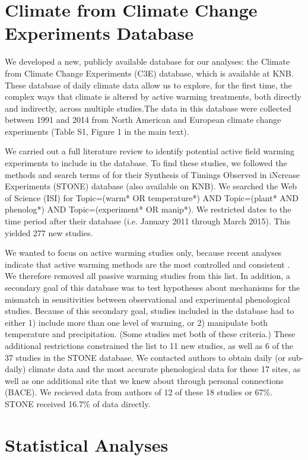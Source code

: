 \documentclass{article}
\begin{document}
\section* {Climate from Climate Change Experiments Database}
\par We developed a new, publicly available database for our analyses: the Climate from Climate Change Experiments (C3E) database, which is available at KNB. These database of daily climate data allow us to explore, for the first time, the complex ways that climate is altered by active warming treatments, both directly and indirectly, across multiple studies.The data in this database were collected between 1991 and 2014 from North American and European climate change experiments (Table S1, Figure 1 in the main text). 
 \par We carried out a full literature review to identify potential active field warming experiments to include in the database. To find these studies, we followed the methods and search terms of \citep{wolkovich2012} for their Synthesis of Timings Observed in iNcrease Experiments (STONE) database (also available on KNB). We searched the Web of Science (ISI) for Topic=(warm* OR temperature*) AND Topic=(plant* AND phenolog*) AND Topic=(experiment* OR manip*). We restricted dates to the time period after their database (i.e. January 2011 through March 2015). This yielded 277 new studies. 
 \par We wanted to focus on active warming studies only, because recent analyses indicate that active warming methods are the most controlled and consistent \citep{kimball2005,kimball2008,aronson2009,wolkovich2012}. We therefore removed all passive warming studies from this list. In addition, a secondary goal of this database was to test hypotheses about mechanisms for the mismatch in sensitivities between observational and experimental phenological studies. Because of this secondary goal, studies included in the database had to either 1) include more than one level of warming, or 2) manipulate both temperature and precipitation. (Some studies met both of these criteria.) These additional restrictions constrained the list to 11 new studies, as well as 6 of the 37 studies in the STONE database. We contacted authors to obtain daily (or sub-daily) climate data and the most accurate phenological data for these 17 sites, as well as one additional site that we knew about through personal connections (BACE).  We recieved data from authors of 12 of these 18 studies or 67\%. STONE received 16.7\% of data directly.
\section* {Statistical Analyses}
\end{document}
